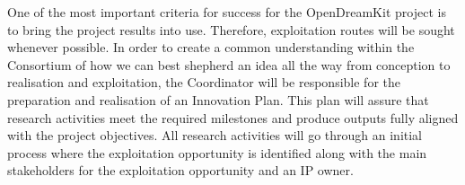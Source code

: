 \begin{workpackage}
\begin{tasklist}
\begin{task}[title=Innovation management,wphases=6-48!.2,
  id=project-innovation-management,lead=PS,PM=10,
  partners={LL,UV,UJF,UB,UO,USH,USO,SA,UW,JU,UK,US,ZH,SR,UG},issue=16] One of the
  most important criteria for success for the OpenDreamKit project is
  to bring the project results into use. Therefore, exploitation
  routes will be sought whenever possible. In order to create a common
  understanding within the Consortium of how we can best shepherd an
  idea all the way from conception to realisation and
  exploitation, the Coordinator will be responsible for the
  preparation and realisation of an Innovation Plan. This plan will assure that
  research activities meet the required milestones and produce outputs 
  fully aligned with the project objectives.  All
  research activities will go through an initial process where the
  exploitation opportunity is identified along with the main
  stakeholders for the exploitation opportunity and an IP owner.
\end{task}
\end{tasklist}

%



\end{workpackage}
